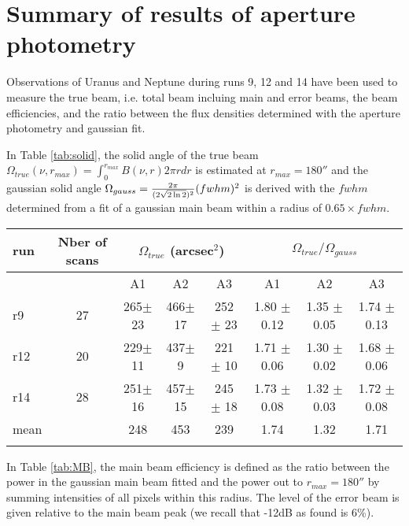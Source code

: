 \section{Summary of results of aperture photometry}


Observations of Uranus and Neptune during runs 9, 12 and 14 have been used to measure the true beam, i.e. total beam incluing main and error beams, 
the beam efficiencies, and the ratio between the flux densities determined with the aperture photometry and gaussian fit.

In Table \ref{tab:solid}, the solid angle of the true beam  $\Omega_{true} (\nu,r_{max}) = \int_0^{r_{max}} B(\nu, r) 2 \pi r dr$
is estimated at $r_{max} =180''$ and
the gaussian solid angle $\Omega_{gauss}={{2\pi} \over {(2 \sqrt{2\ln2})^2}} (fwhm)^2$ is derived with the $fwhm$ determined
from a fit of a gaussian main beam within a radius of $0.65 \times fwhm$. 

\begin{table*}[!h]
\caption{Solid angle of true beam based on Uranus and Neptune observations}
\label{tab:solid}
\centering
\begin{tabular}{l| c | c c c | c c c}
\hline\hline
\noalign{\smallskip}
run  & Nber of scans & \multicolumn{3}{c}{$\Omega_{true}$ (arcsec$^{2}$)} & \multicolumn{3}{c}{$\Omega_{true}/\Omega_{gauss}$} \\
\hline
     &               &  A1    &    A2   &  A3  & A1  &  A2  & A3   \\
            \hline
r9    & 27  &  265$\pm$ 23    &  466$\pm$ 17 & 252 $\pm$ 23 &  1.80 $\pm$ 0.12    &  1.35 $\pm$ 0.05   &   1.74 $\pm$ 0.13   \\
r12   & 20  &  229$\pm$ 11    &  437$\pm$  9 & 221 $\pm$ 10 &  1.71 $\pm$ 0.06   &  1.30 $\pm$ 0.02   &   1.68 $\pm$ 0.06   \\
r14   & 28  &  251$\pm$ 16    &  457$\pm$ 15 & 245 $\pm$ 18 &  1.73 $\pm$ 0.08   &  1.32 $\pm$ 0.03   &   1.72 $\pm$ 0.08   \\
mean  &     &  248            &  453         &  239         &  1.74              &   1.32             &   1.71              \\
       \noalign{\smallskip}
            \hline
\end{tabular}
\end{table*}






In Table \ref{tab:MB}, the main beam efficiency is defined as the ratio between the power in the gaussian main beam fitted and 
the power out to $r_{max}=180''$ by summing intensities of all pixels within this radius. The level of the error beam 
is given relative to the main beam peak (we recall that -12dB as found is 6\%). 

